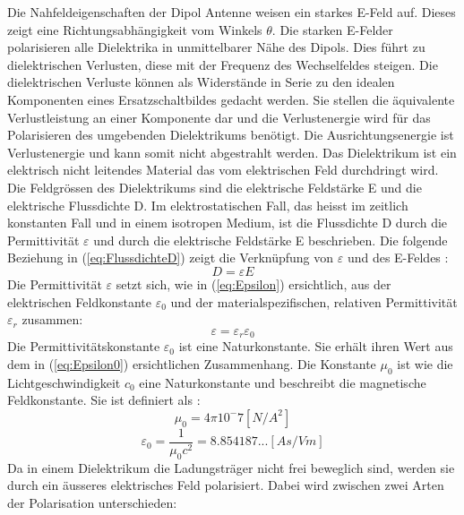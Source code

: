 Die Nahfeldeigenschaften der Dipol Antenne weisen ein starkes E-Feld auf. Dieses zeigt eine Richtungsabhängigkeit vom Winkels $\theta$. Die starken E-Felder polarisieren alle Dielektrika in unmittelbarer Nähe des Dipols. Dies führt zu dielektrischen Verlusten, diese mit der Frequenz des Wechselfeldes steigen. Die dielektrischen Verluste können als Widerstände in Serie zu den idealen Komponenten eines Ersatzschaltbildes gedacht werden. Sie stellen die äquivalente Verlustleistung an einer Komponente dar und die Verlustenergie wird für das Polarisieren des umgebenden Dielektrikums benötigt. Die Ausrichtungsenergie ist Verlustenergie und kann somit nicht abgestrahlt werden.
Das Dielektrikum ist ein elektrisch nicht leitendes Material das vom elektrischen Feld durchdringt wird. Die Feldgrössen des Dielektrikums sind die elektrische Feldstärke E und die elektrische Flussdichte D. Im elektrostatischen Fall, das heisst im zeitlich konstanten Fall und in einem isotropen Medium, ist die Flussdichte D durch die Permittivität $\varepsilon $ und durch die elektrische Feldstärke E beschrieben. Die folgende Beziehung in (\ref{eq:FlussdichteD}) zeigt die Verknüpfung von $\varepsilon$ und des E-Feldes \cite{Emant}:
\begin{equation}\label{eq:FlussdichteD}
D=\varepsilon E
\end{equation}
Die Permittivität $\varepsilon$ setzt sich, wie in (\ref{eq:Epsilon}) ersichtlich, aus der elektrischen Feldkonstante $\varepsilon_0$ und der materialspezifischen, relativen Permittivität $\varepsilon_r$ zusammen:
\begin{equation}\label{eq:Epsilon}
\varepsilon = \varepsilon_r \varepsilon_0
\end{equation}
Die Permittivitätskonstante $\varepsilon_{0}$ ist eine Naturkonstante. Sie erhält ihren Wert aus dem in (\ref{eq:Epsilon0}) ersichtlichen Zusammenhang. Die Konstante $\mu_{0}$ ist wie die Lichtgeschwindigkeit $c_0$ eine Naturkonstante und beschreibt die magnetische Feldkonstante. Sie ist definiert als \cite {WikiPermitt}: 
\begin{equation}\label{mu_0}
\mu_{0}=4\pi10^-7 [N/A^{2}] 
\end{equation}
\begin{equation}\label{eq:Epsilon0}
\varepsilon_{0} = \dfrac{1}{\mu_{0}c^{2}}=8.854187...[As/Vm]
\end{equation}
Da in einem Dielektrikum die Ladungsträger nicht frei beweglich sind, werden sie durch ein äusseres elektrisches Feld polarisiert. Dabei wird zwischen zwei Arten der Polarisation unterschieden:
